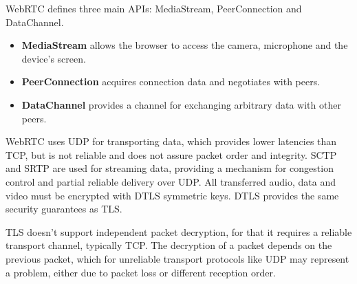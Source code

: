 \ac{WebRTC} defines three main \ac{API}s: MediaStream, PeerConnection and DataChannel. 

\begin{itemize}
  \item \textbf{MediaStream} allows the browser to access the camera, microphone and the device's screen. 

  \item \textbf{PeerConnection} acquires connection data and negotiates with peers.
  \item \textbf{DataChannel} provides a channel for exchanging arbitrary data with other peers.
\end{itemize}

\ac{WebRTC} uses \ac{UDP} for transporting data, which provides lower latencies than \ac{TCP}, but is not reliable and does not assure packet order and integrity. \ac{SCTP} and \ac{SRTP} are used for streaming data, providing a mechanism for congestion control and partial reliable delivery over \ac{UDP}. All transferred audio, data and video must be encrypted with \ac{DTLS} symmetric keys. \ac{DTLS} provides the same security guarantees as \ac{TLS}. 

\ac{TLS} doesn't support independent packet decryption\cite{rfc6347}, for that it requires a reliable transport channel, typically \ac{TCP}. The decryption of a packet depends on the previous packet, which for unreliable transport protocols like \ac{UDP} may represent a problem, either due to packet loss or different reception order.

